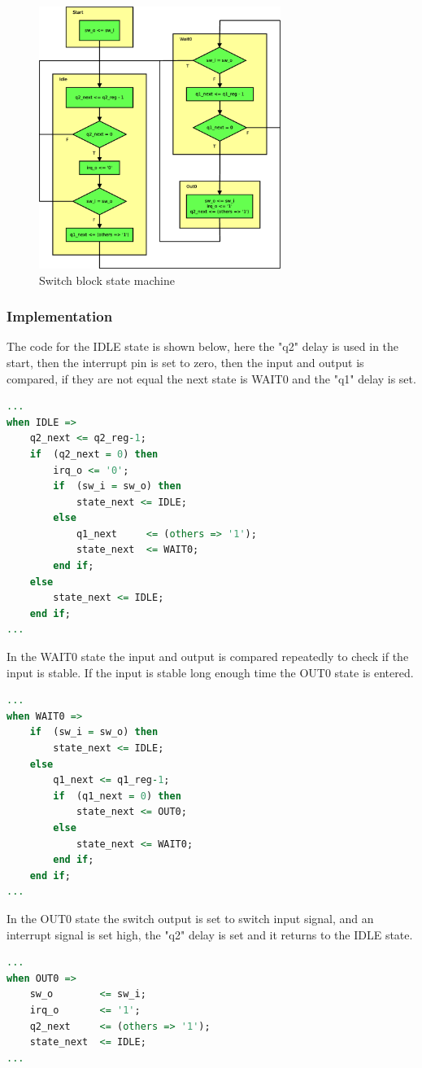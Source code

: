 \begin{figure}[H]
	\begin{centering}
		\includegraphics[width=0.7\textwidth]{images/tb6_switch_FSD.eps}
		\caption{Switch block state machine}
	\end{centering}
\end{figure}

\subsubsection{Implementation}
%
%
The code for the IDLE state is shown below, here the "q2" delay is used in the start, then the interrupt pin is set to zero, then the input and output is compared, if they are not equal the next state is WAIT0 and the "q1" delay is set.
\begin{lstlisting}[language=VHDL]
...
when IDLE =>
	q2_next <= q2_reg-1;
	if	(q2_next = 0) then
		irq_o <= '0';
		if	(sw_i = sw_o) then
			state_next <= IDLE;
		else
			q1_next		<= (others => '1');
			state_next	<= WAIT0;
		end if;
	else
		state_next <= IDLE;
	end if;
...
\end{lstlisting}
In the WAIT0 state the input and output is compared repeatedly to check if the input is stable. If the input is stable long enough time the OUT0 state is entered.
\begin{lstlisting}[language=VHDL]
...
when WAIT0 =>
	if	(sw_i = sw_o) then
		state_next <= IDLE;
	else
		q1_next <= q1_reg-1;
		if	(q1_next = 0) then
			state_next <= OUT0;
		else
			state_next <= WAIT0;
		end if;
	end if;
...
\end{lstlisting}
In the OUT0 state the switch output is set to switch input signal, and an interrupt signal is set high, the "q2" delay is set and it returns to the IDLE state.
\begin{lstlisting}[language=VHDL]
...
when OUT0 =>
	sw_o		<= sw_i;
	irq_o		<= '1';
	q2_next		<= (others => '1');
	state_next	<= IDLE;
...
\end{lstlisting}

